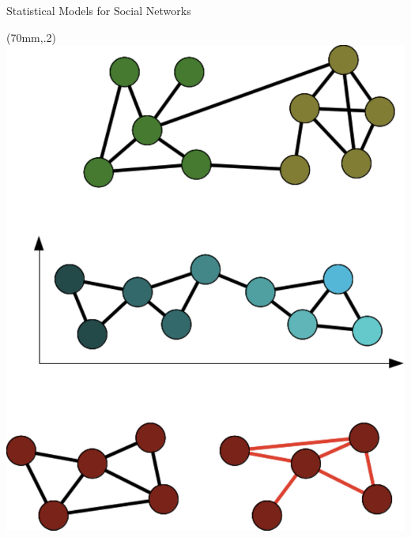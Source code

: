 \documentclass[10pt]{beamer}
\begin{document}
\begin{frame}{Statistical Models for Social Networks}
{\begin{textblock*}{50mm}(70mm,.2\textheight)
\includegraphics[width=1\linewidth]{graphics/networkexample1.pdf} 
\end{textblock*}

}
\end{frame}
\end{document}

